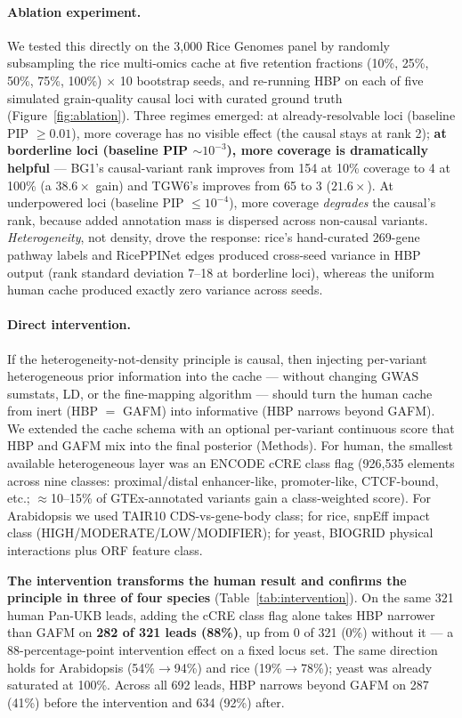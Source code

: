 \paragraph{Ablation experiment.} We tested this directly on the
3{,}000 Rice Genomes panel by randomly subsampling the rice
multi-omics cache at five retention fractions (10\%, 25\%, 50\%, 75\%,
100\%) $\times$ 10 bootstrap seeds, and re-running HBP on each of
five simulated grain-quality causal loci with curated ground truth
(Figure~\ref{fig:ablation}). Three regimes emerged: at
already-resolvable loci (baseline PIP $\geq 0.01$), more coverage
has no visible effect (the causal stays at rank 2);
\textbf{at borderline loci (baseline PIP $\sim 10^{-3}$), more
coverage is dramatically helpful} --- BG1's causal-variant rank
improves from 154 at 10\% coverage to 4 at 100\% (a $38.6\times$
gain) and TGW6's improves from 65 to 3 ($21.6\times$). At
underpowered loci (baseline PIP $\leq 10^{-4}$), more coverage
\emph{degrades} the causal's rank, because added annotation mass is
dispersed across non-causal variants. \emph{Heterogeneity}, not
density, drove the response: rice's hand-curated 269-gene pathway
labels and RicePPINet edges produced cross-seed variance in HBP
output (rank standard deviation 7--18 at borderline loci),
whereas the uniform human cache produced exactly zero variance
across seeds.

\paragraph{Direct intervention.} If the heterogeneity-not-density
principle is causal, then injecting per-variant heterogeneous
prior information into the cache --- without changing GWAS
sumstats, LD, or the fine-mapping algorithm --- should turn the
human cache from inert (HBP $=$ GAFM) into informative (HBP narrows
beyond GAFM). We extended the cache schema with an optional
per-variant continuous score that HBP and GAFM mix into the
final posterior (Methods). For human, the smallest available
heterogeneous layer was an ENCODE cCRE class flag\cite{encode2020expanded}
(926{,}535 elements across nine classes:
proximal/distal enhancer-like, promoter-like, CTCF-bound, etc.;
$\approx$10--15\% of GTEx-annotated variants gain a class-weighted
score). For Arabidopsis we used TAIR10 CDS-vs-gene-body class;
for rice, snpEff impact class (HIGH/MODERATE/LOW/MODIFIER); for
yeast, BIOGRID physical interactions plus ORF feature class.

\textbf{The intervention transforms the human result and confirms
the principle in three of four species} (Table~\ref{tab:intervention}).
On the same 321 human Pan-UKB leads, adding the cCRE class flag
alone takes HBP narrower than GAFM on \textbf{282 of 321 leads (88\%)},
up from 0 of 321 (0\%) without it --- a 88-percentage-point
intervention effect on a fixed locus set. The same direction holds
for Arabidopsis (54\%$\to$94\%) and rice (19\%$\to$78\%); yeast was
already saturated at 100\%. Across all 692 leads, HBP narrows
beyond GAFM on 287 (41\%) before the intervention and 634 (92\%)
after.

